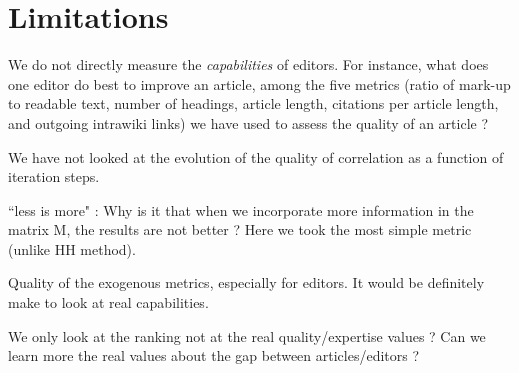 \section{Limitations}
\label{limitations}
We do not directly measure the {\it capabilities} of editors. For instance, what does one editor do best to improve an article, among the five metrics (ratio of mark-up to readable text, number of headings, article length, citations per article length, and outgoing intrawiki links) we have used to assess the quality of an article ? 

We have not looked at the evolution of the quality of correlation as a function of iteration steps.

``less is more" : Why is it that when we incorporate more information in the matrix M, the results are not better ? Here we took the most simple metric (unlike HH method).

Quality of the exogenous metrics, especially for editors. It would be definitely make to look at real capabilities.

We only look at the ranking not at the real quality/expertise values ? Can we learn more the real values about the gap between articles/editors ?

